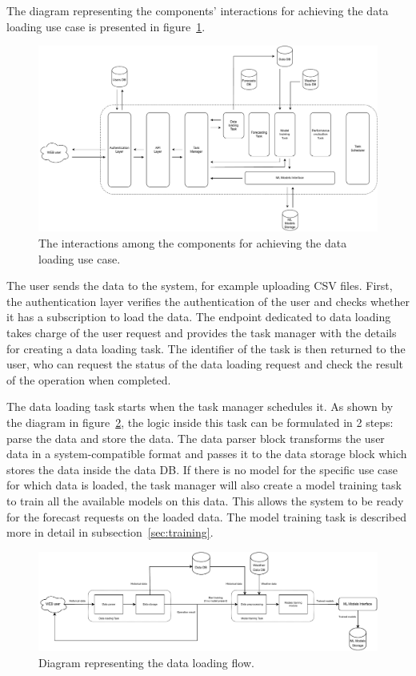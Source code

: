The diagram representing the components' interactions for achieving the data loading use case is presented in figure~\ref{fig:loadinginteractions}.

\begin{figure}[H]
\centering
\includegraphics[width=1\textwidth]{images/architecture_data_loading_interactions}
\caption{The interactions among the components for achieving the data loading use case.}
\label{fig:loadinginteractions}
\end{figure}

The user sends the data to the system, for example uploading CSV files.
First, the authentication layer verifies the authentication of the user and checks whether it has a subscription to load the data.
The endpoint dedicated to data loading takes charge of the user request and provides the task manager with the details for creating a data loading task.
The identifier of the task is then returned to the user, who can request the status of the data loading request and check the result of the operation when completed.

The data loading task starts when the task manager schedules it.
As shown by the diagram in figure~\ref{fig:loadingflow}, the logic inside this task can be formulated in 2 steps: parse the data and store the data.
The data parser block transforms the user data in a system-compatible format and passes it to the data storage block which stores the data inside the data DB.
If there is no model for the specific use case for which data is loaded, the task manager will also create a model training task to train all the available models on this data.
This allows the system to be ready for the forecast requests on the loaded data.
The model training task is described more in detail in subsection~\ref{sec:training}.

\begin{figure}[H]
\centering
\includegraphics[width=1\textwidth]{images/architecture_data_loading_flow}
\caption{Diagram representing the data loading flow.}
\label{fig:loadingflow}
\end{figure}

